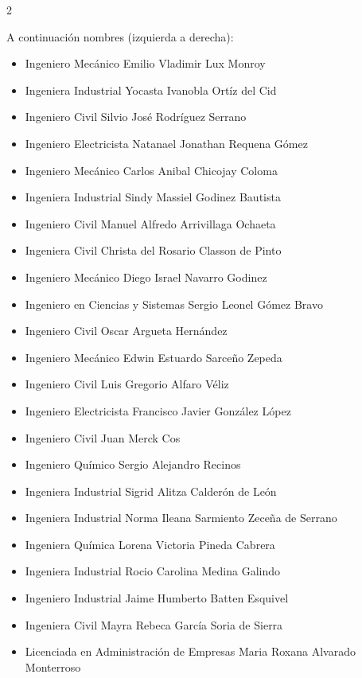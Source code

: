 \documentclass[12pt,spanish,Letterpaper,openany]{book}
\providecommand{\tightlist}{%
  \setlength{\itemsep}{0pt}\setlength{\parskip}{0pt}}
\newcommand{\spacethreemilis}{\vspace{3mm}}
\newcommand{\spacetwomilis}{\vspace{2mm}}
\begin{document}
\begin {multicols}{2}

A continuación nombres (izquierda a derecha):
\spacethreemilis

\begin{itemize}
\tightlist
\item
  Ingeniero Mecánico Emilio Vladimir Lux Monroy
  \spacetwomilis
\item
  Ingeniera Industrial Yocasta Ivanobla Ortíz del Cid
  \spacetwomilis
\item
  Ingeniero Civil Silvio José Rodríguez Serrano
  \spacetwomilis
\item
  Ingeniero Electricista Natanael Jonathan Requena Gómez
  \spacetwomilis
\item
  Ingeniero Mecánico Carlos Anibal Chicojay Coloma
  \spacetwomilis
\item
  Ingeniera Industrial Sindy Massiel Godinez Bautista
  \spacetwomilis
\item
  Ingeniero Civil Manuel Alfredo Arrivillaga Ochaeta
  \spacetwomilis
\item
  Ingeniera Civil Christa del Rosario Classon de Pinto
  \spacetwomilis
\item
  Ingeniero Mecánico Diego Israel Navarro Godinez
  \spacetwomilis
\item
  Ingeniero en Ciencias y Sistemas Sergio Leonel Gómez Bravo
  \spacetwomilis
\item
  Ingeniero Civil Oscar Argueta Hernández
  \spacetwomilis
\item
  Ingeniero Mecánico Edwin Estuardo Sarceño Zepeda
  \spacetwomilis
\item
  Ingeniero Civil Luis Gregorio Alfaro Véliz
  \spacetwomilis
\item
  Ingeniero Electricista Francisco Javier González López
  \spacetwomilis
\item
  Ingeniero Civil Juan Merck Cos
  \spacetwomilis
\item
  Ingeniero Químico Sergio Alejandro Recinos
  \spacetwomilis
\item
  Ingeniera Industrial Sigrid Alitza Calderón de León
  \spacetwomilis
\item
  Ingeniera Industrial Norma Ileana Sarmiento Zeceña de Serrano
  \spacetwomilis
\item
  Ingeniera Química Lorena Victoria Pineda Cabrera
  \spacetwomilis
\item
  Ingeniera Industrial Rocio Carolina Medina Galindo
  \spacetwomilis
\item
  Ingeniero Industrial Jaime Humberto Batten Esquivel
  \spacetwomilis
\item
  Ingeniera Civil Mayra Rebeca García Soria de Sierra
  \spacetwomilis
\item
  Licenciada en Administración de Empresas Maria Roxana Alvarado Monterroso
\end{itemize}

\end {multicols}
\end{document}
